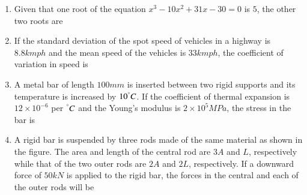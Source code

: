 \documentclass[journal,12pt,onecolumn]{IEEEtran}
\theoremstyle{remark}
\begin{document}
\begin{enumerate}
\item Given that one root of the equation $x^3-10x^2+31x-30=0$ is $5$, the other two roots are

\hfill{}
\begin{enumerate}
\end{enumerate}

\item If the standard deviation of the spot speed of vehicles in a highway is $8.8kmph$ and the mean speed of the vehicles is $33kmph$, the coefficient of variation in speed is 

\hfill{}
\begin{enumerate}
\end{enumerate}

\item A metal bar of length $100mm$ is inserted between two rigid supports and its temperature is increased by $10^\degree C$. If the coefficient of thermal expansion is $12\times 10^{-6}$ per $^\degree C$ and the Young's modulus is $2\times 10^5 MPa$, the stress in the bar is

\hfill{}
\begin{enumerate}
\end{enumerate}

\item A rigid bar is suspended by three rods made of the same material as shown in the figure. The area and length of the central rod are $3A$ and $L$, respectively while that of the two outer rods are $2A$ and $2L$, respectively. If a downward force of $50kN$ is applied to the rigid bar, the forces in the central and each of the outer rods will be
\\\begin{center}
   \scalebox{0.5}{}
\end{center}


\end{enumerate}
\end{document}
